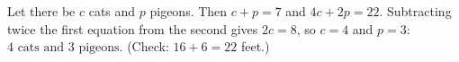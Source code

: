 Let there be $c$ cats and $p$ pigeons. Then $c+p=7$ and $4c+2p=22$. Subtracting twice the first equation from the second gives $2c=8$, so $c=4$ and $p=3$: $\boxed{4\text{ cats and }3\text{ pigeons}}$. (Check: $16+6=22$ feet.)
